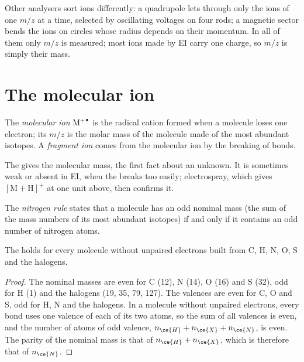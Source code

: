Other analysers sort ions differently: a quadrupole lets through only the ions of one $m/z$ at a time,
selected by oscillating voltages on four rods; a magnetic sector bends the ions on circles whose radius
depends on their momentum. In all of them only $m/z$ is measured; most ions made by EI carry one
charge, so $m/z$ is simply their mass.

\section{The molecular ion}

\begin{definition}\label{def:b2:mass-spec-atomic:molecular-ion}
The \emph{molecular ion} $\mathrm M^{+\bullet}$ is the radical cation formed when a
molecule loses one electron; its $m/z$ is the molar mass of the molecule made of the most abundant
isotopes. A \emph{fragment ion} comes from the molecular ion by the breaking of
bonds.
\end{definition}

The  gives the molecular mass, the first fact about an unknown. It is sometimes weak or
absent in EI, when the  breaks too easily; electrospray, which gives $[\mathrm M +
\mathrm H]^+$ at one unit above, then confirms it.

\begin{definition}\label{def:b2:mass-spec-atomic:nitrogen-rule}
The \emph{nitrogen rule} states that a molecule has an odd nominal mass (the sum
of the mass numbers of its most abundant isotopes) if and only if it contains an odd number of nitrogen
atoms.
\end{definition}

\begin{proposition}\label{prop:b2:mass-spec-atomic:nitrogen-rule}
The  holds for every molecule without unpaired electrons built from C, H, N, O, S and the
halogens.
\end{proposition}

\begin{proof}
The nominal masses are even for C (12), N (14), O (16) and S (32), odd for H (1) and the halogens (19,
35, 79, 127). The valences are even for C, O and S, odd for H, N and the halogens. In a molecule
without unpaired electrons, every bond uses one valence of each of its two atoms, so the sum of all
valences is even, and the number of atoms of odd valence, $n_{\ce{H}} + n_{\ce{X}} + n_{\ce{N}}$, is
even. The parity of the nominal mass is that of $n_{\ce{H}} + n_{\ce{X}}$, which is therefore that of
$n_{\ce{N}}$.
\end{proof}

